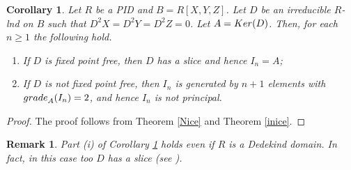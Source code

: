 \documentclass[a4paper,12pt]{article}
\newtheorem{cor}[thm]{Corollary}
\newtheorem{rem}[thm]{Remark}
\newcommand{\bR}{\mathbb R}
\begin{document}
{\begin{cor}\label{pid}
Let $R$ be a {\rm PID} and $B=R[X,Y,Z]$. Let $D$ be an irreducible $R$-lnd on $B$ such that $D^2X=D^2Y=D^2Z=0$. Let $A={\rm Ker}(D)$. Then, for each $n \geqslant 1 $ the following hold.
\begin{enumerate}
	\item [\rm(i)]If $D$ is fixed point free, then $D$ has a slice and hence $I_n=A$; 
	\item[\rm(ii)]If $D$ is not fixed point free, then $I_n$ is generated by $n+1$ elements with ${\rm grade}_A(I_n)=2$, and hence $I_n$ is not principal.
\end{enumerate}
\end{cor}

\begin{proof} The proof follows from Theorem \ref{Nice} and Theorem \ref{inice}.
\end{proof}

\begin{rem}
\em{Part (i) of Corollary \ref{pid} holds even if  $R$ is a  Dedekind domain. In fact, in this case too $D$ has a slice (see \cite[Proposition 3.8]{DG}).}
		
	

\end{rem}

}
\end{document}
